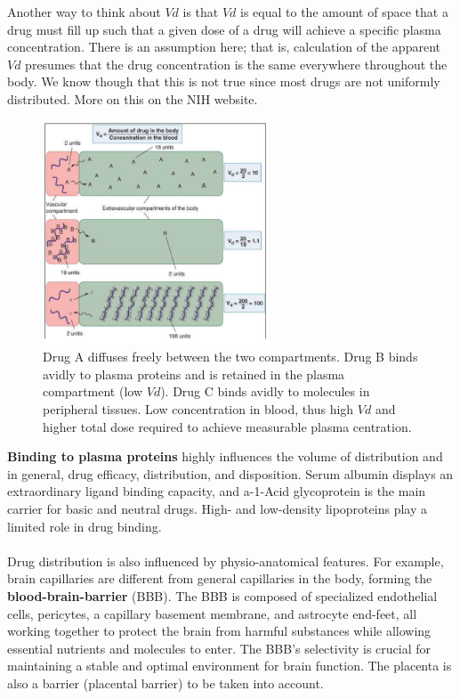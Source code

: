 \documentclass{book}
\begin{document}
Another way to think about $Vd$ is that $Vd$ is equal to the amount of space that a drug
must fill up such that a given dose of a drug will achieve a specific plasma concentration. 
There is an assumption here; that is, calculation of the apparent $Vd$ presumes that the drug concentration is the same everywhere throughout the body.
We know though that this is not true since most drugs are not uniformly distributed.
More on this on the NIH website\cite{NIH}.

\begin{figure}
    \includegraphics[width=0.6\textwidth, center]{images/image5.png}
    \caption{Drug A diffuses freely between the two compartments. Drug B binds avidly to plasma proteins and is retained in the plasma compartment (low $Vd$). Drug C binds avidly to molecules in peripheral tissues. Low concentration in blood, thus high $Vd$ and higher total dose required to achieve measurable plasma centration.}
\end{figure}

\textbf{Binding to plasma proteins} highly influences the volume of distribution and in general, drug efficacy, distribution, and disposition. 
Serum albumin displays an extraordinary ligand binding capacity, and a-1-Acid glycoprotein is the main carrier for basic and neutral drugs.
High- and low-density lipoproteins play a limited role in drug binding.
\\
\\
Drug distribution is also influenced by physio-anatomical features.
For example, brain capillaries are different from general capillaries in the body, forming the \textbf{blood-brain-barrier} (BBB).
The BBB is composed of specialized endothelial cells, pericytes, a capillary basement membrane, and astrocyte end-feet, all working together to protect the brain from harmful substances while allowing essential nutrients and molecules to enter. 
The BBB's selectivity is crucial for maintaining a stable and optimal environment for brain function. 
The placenta is also a barrier (placental barrier) to be taken into account.
\end{document}
